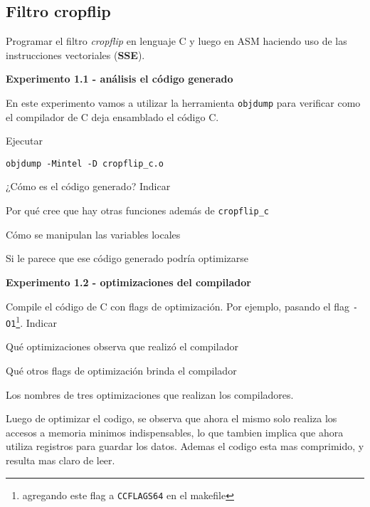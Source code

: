 \subsection{Filtro cropflip}

Programar el filtro \textit{cropflip} en lenguaje C y luego en ASM haciendo 
uso de las instrucciones vectoriales (\textbf{SSE}).

\vspace*{0.3cm} \noindent
\textbf{Experimento 1.1 - análisis el código generado}

En este experimento vamos a utilizar la herramienta \verb|objdump| para 
verificar como el compilador de C deja ensamblado el código C.

Ejecutar 
\begin{codesnippet}
\begin{verbatim}
objdump -Mintel -D cropflip_c.o
\end{verbatim}
\end{codesnippet}

¿Cómo es el código generado? 
Indicar
\begin{inparaenum}
    \item Por qué cree que hay otras funciones además de \verb|cropflip_c|
    \item Cómo se manipulan las variables locales
    \item Si le parece que ese código generado podría optimizarse
\end{inparaenum}

\vspace*{0.3cm} \noindent
\textbf{Experimento 1.2 - optimizaciones del compilador}

Compile el código de C con flags de optimización. Por ejemplo, pasando el flag 
\verb|-O1|\footnote{agregando este flag a \texttt{CCFLAGS64} en el makefile}. 
Indicar
\begin{inparaenum}
    \item Qué optimizaciones observa que realizó el compilador
    \item Qué otros flags de optimización brinda el compilador
    \item Los nombres de tres optimizaciones que realizan los compiladores.
\end{inparaenum}

Luego de optimizar el codigo, se observa que ahora el mismo solo realiza los accesos a memoria minimos indispensables, lo que tambien implica que ahora utiliza registros para guardar los datos. Ademas el codigo esta mas comprimido, y resulta mas claro de leer.


